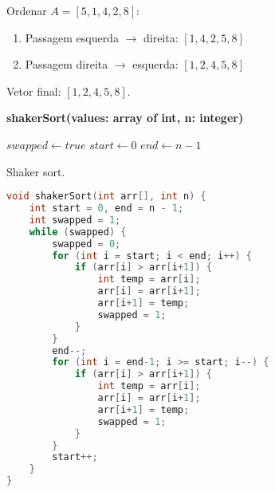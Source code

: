 \begin{exmp}
Ordenar $A = [5, 1, 4, 2, 8]$:

\begin{enumerate}
    \item Passagem esquerda $\to$ direita: $[1, 4, 2, 5, 8]$
    \item Passagem direita $\to$ esquerda: $[1, 2, 4, 5, 8]$
\end{enumerate}
Vetor final: $[1, 2, 4, 5, 8]$.
\end{exmp}

\begin{center}
\begin{minipage}{.9\linewidth}
\begin{algorithm}[H]
\DontPrintSemicolon
\textbf{shakerSort(values: array of int, n: integer)}

$swapped \gets true$\;
$start \gets 0$\;
$end \gets n-1$\;

\caption{Shaker sort.}
\label{lab:alg-shakerSort}
\end{algorithm}
\end{minipage}
\end{center}

\begin{lstlisting}[language=C,caption={Shaker sort em C},captionpos=t]
void shakerSort(int arr[], int n) {
    int start = 0, end = n - 1;
    int swapped = 1;
    while (swapped) {
        swapped = 0;
        for (int i = start; i < end; i++) {
            if (arr[i] > arr[i+1]) {
                int temp = arr[i];
                arr[i] = arr[i+1];
                arr[i+1] = temp;
                swapped = 1;
            }
        }
        end--;
        for (int i = end-1; i >= start; i--) {
            if (arr[i] > arr[i+1]) {
                int temp = arr[i];
                arr[i] = arr[i+1];
                arr[i+1] = temp;
                swapped = 1;
            }
        }
        start++;
    }
}
\end{lstlisting}

